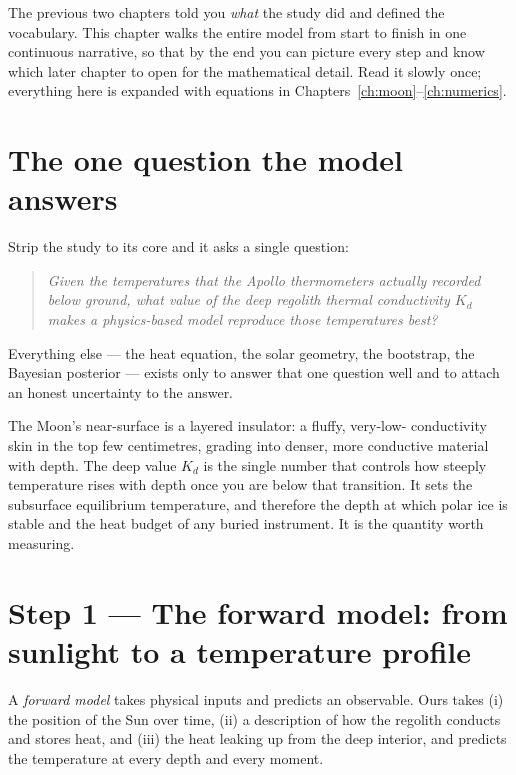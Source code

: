 \documentclass[11pt]{report}
\begin{document}
The previous two chapters told you \emph{what} the study did and
defined the vocabulary. This chapter walks the entire model from
start to finish in one continuous narrative, so that by the end you
can picture every step and know which later chapter to open for the
mathematical detail. Read it slowly once; everything here is
expanded with equations in Chapters~\ref{ch:moon}--\ref{ch:numerics}.

\section{The one question the model answers}

Strip the study to its core and it asks a single question:

\begin{quote}
\emph{Given the temperatures that the Apollo thermometers actually
recorded below ground, what value of the deep regolith thermal
conductivity $K_d$ makes a physics-based model reproduce those
temperatures best?}
\end{quote}

Everything else --- the heat equation, the solar geometry, the
bootstrap, the Bayesian posterior --- exists only to answer that one
question well and to attach an honest uncertainty to the answer.

\begin{aside}
The Moon's near-surface is a layered insulator: a fluffy, very-low-
conductivity skin in the top few centimetres, grading into denser,
more conductive material with depth. The deep value $K_d$ is the
single number that controls how steeply temperature rises with depth
once you are below that transition. It sets the subsurface
equilibrium temperature, and therefore the depth at which polar ice
is stable and the heat budget of any buried instrument. It is the
quantity worth measuring.
\end{aside}

\section{Step 1 --- The forward model: from sunlight to a temperature profile}

A \emph{forward model} takes physical inputs and predicts an
observable. Ours takes (i) the position of the Sun over time, (ii) a
description of how the regolith conducts and stores heat, and (iii)
the heat leaking up from the deep interior, and predicts the
temperature at every depth and every moment.
\end{document}
